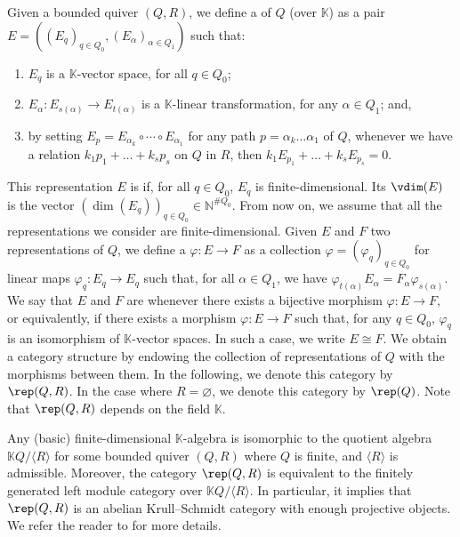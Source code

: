 Given a bounded quiver $(Q,R)$, we define a  of $Q$ (over $\mathbb{K}$) as a pair $E=((E_q)_{q \in Q_0}, (E_\alpha)_{\alpha \in Q_1})$ such that:
\begin{enumerate}[label=$\bullet$, itemsep=1mm]
    \item $E_q$ is a $\mathbb{K}$-vector space, for all $q \in Q_0$;
    \item  $E_\alpha : E_{s(\alpha)} \longrightarrow E_{t(\alpha)}$ is a $\mathbb{K}$-linear transformation, for any $\alpha \in Q_1$; and,
    \item by setting $E_p = E_{\alpha_k} \circ \cdots \circ E_{\alpha_1}$ for any path $p = \alpha_k \ldots \alpha_1$ of $Q$, whenever we have a relation $k_1 p_1 + \ldots + k_s p_s$ on $Q$ in $R$, then $k_1 E_{p_1} + \ldots  + k_s E_{p_s} = 0$.
\end{enumerate}
This representation $E$ is  if, for all $q \in Q_0$, $E_q$ is finite-dimensional. Its  $\vdim(E)$ is the vector $(\dim(E_q))_{q \in Q_0} \in \mathbb{N}^{\#Q_0}$. From now on, we assume that all the representations we consider are finite-dimensional. Given $E$ and $F$ two representations of $Q$, we define a  $\varphi : E \longrightarrow F$ as a collection $\varphi = (\varphi_q)_{q \in Q_0}$ for linear maps $\varphi_q : E_q \longrightarrow E_q$ such that, for all $\alpha \in Q_1$, we have $\varphi_{t(\alpha)} E_\alpha = F_\alpha \varphi_{s(\alpha)}$. We say that $E$ and $F$ are  whenever there exists a bijective morphism $\varphi : E \longrightarrow F$, or equivalently, if there exists a morphism $\varphi : E \longrightarrow F$ such that, for any $q \in Q_0$, $\varphi_q$ is an isomorphism of $\mathbb{K}$-vector spaces. In such a case, we write $E\cong F$. We obtain a category structure by endowing the collection of representations of $Q$ with the morphisms between them. In the following, we denote this category by $\rep(Q,R)$. In the case where $R = \varnothing$, we denote this category by $\rep(Q)$. Note that $\rep(Q, R)$ depends on the field $\mathbb{K}$.

 Any (basic) finite-dimensional $\mathbb{K}$-algebra is isomorphic to the quotient algebra $\mathbb{K}Q/\langle R \rangle$ for some bounded quiver $(Q,R)$ where $Q$ is finite, and $\langle R \rangle$ is admissible. Moreover, the category $\rep(Q,R)$ is equivalent to the finitely generated left module category over $\mathbb{K}Q/\langle R \rangle$. In particular, it implies that $\rep(Q,R)$ is an abelian Krull--Schmidt category with enough projective objects. We refer the reader to \cite{ASS06} for more details. 
 
